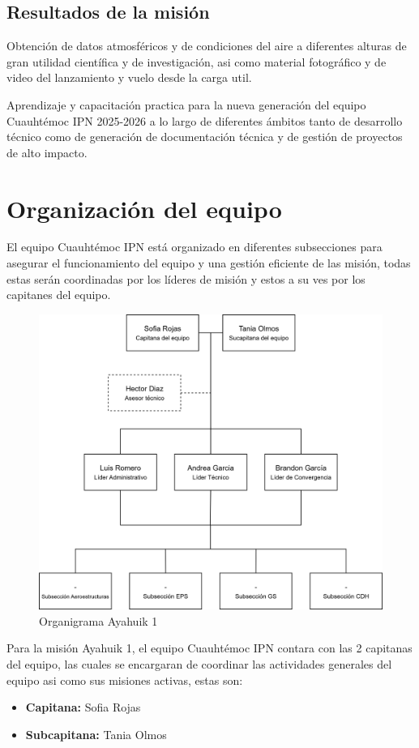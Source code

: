 \documentclass[letterpaper,12pt]{article} %
\begin{document}
    \subsection{Resultados de la misión}

    Obtención de datos atmosféricos y de condiciones del aire a diferentes alturas de gran utilidad
    científica y de investigación, asi como material fotográfico y de video del lanzamiento y vuelo desde la carga util.
    
    Aprendizaje y capacitación practica para la nueva generación del equipo Cuauhtémoc IPN 2025-2026 a lo largo de diferentes
    ámbitos tanto de desarrollo técnico como de generación de documentación técnica y de gestión de proyectos de alto impacto. 



\newpage

\section{Organización del equipo}

    El equipo Cuauhtémoc IPN está organizado en diferentes subsecciones para asegurar el funcionamiento del equipo y una gestión 
    eficiente de las misión, todas estas serán coordinadas por los líderes de misión 
    y estos a su ves por los capitanes del equipo. 
    \begin{figure}[!h]
      \centerline{\includegraphics[width=.5\textwidth]{ORG-AYA1-GM-V3.png}}
      \caption{Organigrama Ayahuik 1}
      \label{1}
    \end{figure}
    
    Para la misión Ayahuik 1, el equipo Cuauhtémoc IPN contara con las 2 capitanas del equipo, 
    las cuales se encargaran de coordinar las actividades generales del equipo asi como sus misiones activas, 
    estas son:

    \begin{itemize}
        \item \textbf{Capitana:} Sofia Rojas
        \item \textbf{Subcapitana:} Tania Olmos
    
    \end{itemize}
\end{document}
